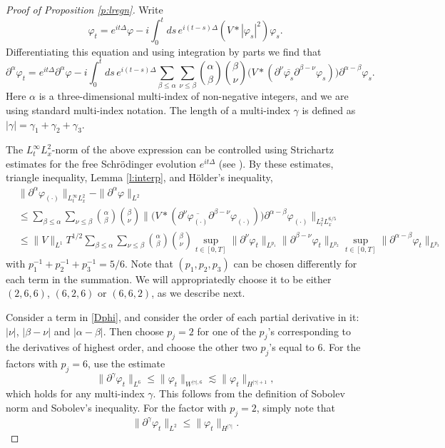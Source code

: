 \documentclass[11pt,a4paper]{scrartcl}
\begin{document}
\begin{proof}[Proof of Proposition \ref{p:lregn}]
  Write
  \[
    \varphi_t = e^{it\Delta} \varphi - i \int_0^t ds \, e^{i(t-s)\Delta} (V *
    |\varphi_s|^2) \varphi_s.
  \]
  Differentiating this equation and using integration by parts we find that
  \[
    \partial^\alpha \varphi_t = e^{it \Delta} \partial^\alpha \varphi - i
    \int_0^t ds \, e^{i(t-s) \Delta} \sum_{\beta \le \alpha} \sum_{\nu \le
    \beta} \binom{\alpha}{\beta} \binom{\beta}{\nu} \big( V * (\partial^\nu
    \overline{\varphi_s} \partial^{\beta - \nu} \varphi_s) \big)
    \partial^{\alpha - \beta} \varphi_s.
  \]
  Here $\alpha$ is a three-dimensional multi-index of non-negative integers,
  and we are using standard multi-index notation. The length of a multi-index
  $\gamma$ is defined as $|\gamma| = \gamma_1 + \gamma_2 + \gamma_3$.


  The $L_t^\infty L_x^2$-norm of the above expression can be controlled using
  Strichartz estimates for the free Schr\"odinger evolution $e^{it\Delta}$
  (see \cite[Theorem 1.2]{KT}). By these estimates, triangle inequality, Lemma
  \ref{l:interp}, and H\"older's inequality,
  \begin{equation} \label{Dphi}
    \begin{split}
      & \| \partial^\alpha \varphi_{(\cdot)} \|_{L_t^\infty L_x^2} - \|
      \partial^\alpha \varphi \|_{L^2} \\
      & \le \sum_{\beta \le \alpha} \sum_{\nu \le \beta} \binom{\alpha}{\beta}
      \binom{\beta}{\nu} \| \big( V * (\partial^\nu
      \overline{\varphi_{(\cdot)}} \partial^{\beta - \nu} \varphi_{(\cdot)})
      \big) \partial^{\alpha - \beta} \varphi_{(\cdot)} \|_{L_t^2 L_x^{6/5}}
      \\
      & \le \| V \|_{L^1} T^{1/2} \sum_{\beta \le \alpha} \sum_{\nu \le \beta}
      \binom{\alpha}{\beta} \binom{\beta}{\nu} \sup_{t \in [0,T]} \|
      \partial^\nu \varphi_t \|_{L^{p_1}} \| \partial^{\beta - \nu} \varphi_t
      \|_{L^{p_2}} \sup_{t \in [0,T]} \| \partial^{\alpha - \beta} \varphi_t
      \|_{L^{p_3}}
    \end{split}
  \end{equation}
  with $p_1^{-1} + p_2^{-1} + p_3^{-1} = 5/6$. Note that $(p_1, p_2, p_3)$ can
  be chosen differently for each term in the summation. We will appropriatedly
  choose it to be either $(2,6,6)$, $(6,2,6)$ or $(6,6,2)$, as we describe
  next.


  Consider a term in \eqref{Dphi}, and consider the order of each partial
  derivative in it: $|\nu|$, $|\beta-\nu|$ and $|\alpha-\beta|$. Then choose
  $p_j = 2$ for one of the $p_j$'s corresponding to the derivatives of highest
  order, and choose the other two $p_j$'s equal to $6$. For the factors with
  $p_j = 6$, use the estimate
  \[
    \| \partial^\gamma \varphi_t \|_{L^6} \le \| \varphi_t \|_{W^{|\gamma|,6}}
    \apprle \| \varphi_t \|_{H^{|\gamma|+1}},
  \]
  which holds for any multi-index $\gamma$. This follows from the definition
  of Sobolev norm and Sobolev's inequality. For the factor with $p_j = 2$,
  simply note that
  \[
    \| \partial^\gamma \varphi_t \|_{L^2} \le \| \varphi_t \|_{H^{|\gamma|}}.
  \]



\end{proof}
\end{document}
